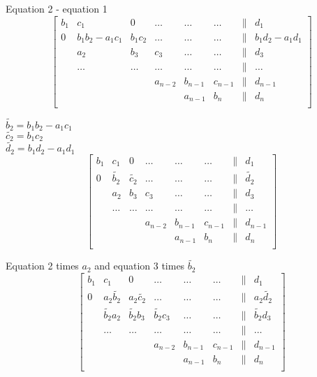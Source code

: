 Equation 2 - equation 1\\
\[
\begin{bmatrix}
     b_1 & c_1                   & 0     & \dots    & \dots   & \dots    & \| & d_1 \\
     0   & b_1 b_2 - a_1 c_1     & b_1 c_2   & \dots    & \dots   & \dots    & \| & b_1 d_2 - a_1 d_1 \\
         & a_2                   & b_3   & c_3      & \dots   & \dots    & \| & d_3 \\
         & \dots                 & \dots & \dots    & \dots   & \dots    & \| & \dots \\
         &                       &       & a_{n-2}  & b_{n-1} & c_{n-1}  & \| & d_{n-1} \\
         &                       &       &          & a_{n-1} & b_n      & \| & d_n \\
\end{bmatrix}  
\]

$\tilde{b_2} = b_1 b_2 - a_1 c_1$ \\
$\tilde{c_2} = b_1 c_2$ \\
$\tilde{d_2} = b_1 d_2 - a_1 d_1$ \\

\[
\begin{bmatrix}
     b_1 & c_1                   & 0     & \dots    & \dots   & \dots    & \| & d_1 \\
     0   & \tilde{b_2} & \tilde{c_2}   & \dots    & \dots   & \dots    & \| & \tilde{d_2} \\
         & a_2                   & b_3   & c_3      & \dots   & \dots    & \| & d_3 \\
         & \dots                 & \dots & \dots    & \dots   & \dots    & \| & \dots \\
         &                       &       & a_{n-2}  & b_{n-1} & c_{n-1}  & \| & d_{n-1} \\
         &                       &       &          & a_{n-1} & b_n      & \| & d_n \\
\end{bmatrix}  
\]

Equation 2 times $a_2$ and equation 3 times $\tilde{b_2}$\\

\[
\begin{bmatrix}
     b_1 & c_1                   & 0     & \dots    & \dots   & \dots    & \| & d_1 \\
     0   & a_2 \tilde{b_2}       & a_2 \tilde{c_2}   & \dots    & \dots   & \dots    & \| & a_2 \tilde{d_2} \\
         & \tilde{b_2} a_2       & \tilde{b_2} b_3   & \tilde{b_2} c_3      & \dots   & \dots    & \| & \tilde{b_2} d_3 \\
         & \dots                 & \dots & \dots    & \dots   & \dots    & \| & \dots \\
         &                       &       & a_{n-2}  & b_{n-1} & c_{n-1}  & \| & d_{n-1} \\
         &                       &       &          & a_{n-1} & b_n      & \| & d_n \\
\end{bmatrix}  
\]

